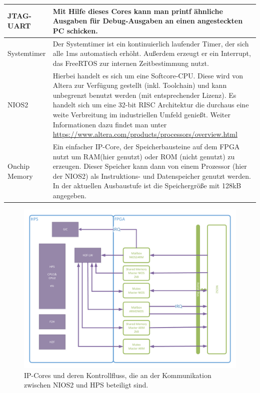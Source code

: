 \begin{longtable}[ht]{|p{} | p{} |}
	JTAG-UART & Mit Hilfe dieses Cores kann man printf ähnliche Ausgaben für Debug-Ausgaben an einen angesteckten PC schicken. \\ \hline
	Systemtimer & Der Systemtimer ist ein kontinuierlich laufender Timer, der sich alle 1ms automatisch erhöht. Außerdem erzeugt er ein Interrupt, das FreeRTOS zur internen Zeitbestimmung nutzt. \\ \hline
	NIOS2 & Hierbei handelt es sich um eine Softcore-CPU. Diese wird von Altera zur Verfügung gestellt (inkl. Toolchain) und kann unbegrenzt benutzt werden (mit entsprechender Lizenz). Es handelt sich um eine 32-bit \ac{RISC} Architektur die durchaus eine weite Verbreitung im industriellen Umfeld genießt. Weiter Informationen dazu findet man unter \href{https://www.altera.com/products/processors/overview.html}{https://www.altera.com/products/processors/overview.html} \\ \hline
	Onchip Memory & Ein einfacher \ac{IP}-Core, der Speicherbausteine auf dem \ac{FPGA} nutzt um RAM(hier genutzt) oder ROM (nicht genutzt) zu erzeugen. Dieser Speicher kann dann von einem Prozessor (hier der NIOS2) als Instruktions- und Datenspeicher genutzt werden. In der aktuellen Ausbaustufe ist die Speichergröße mit 128kB angegeben. \\ \hline
\end{longtable}

\begin{figure}
	\includegraphics[angle=0, width=\textwidth]{Abb/Garfield_FPGA_Design_comm.pdf}
	\caption{\ac{IP}-Cores und deren Kontrollfluss, die an der Kommunikation zwischen NIOS2 und \ac{HPS} beteiligt sind.}
	\label{FPGA_IP_FPGA_comm}
\end{figure}

